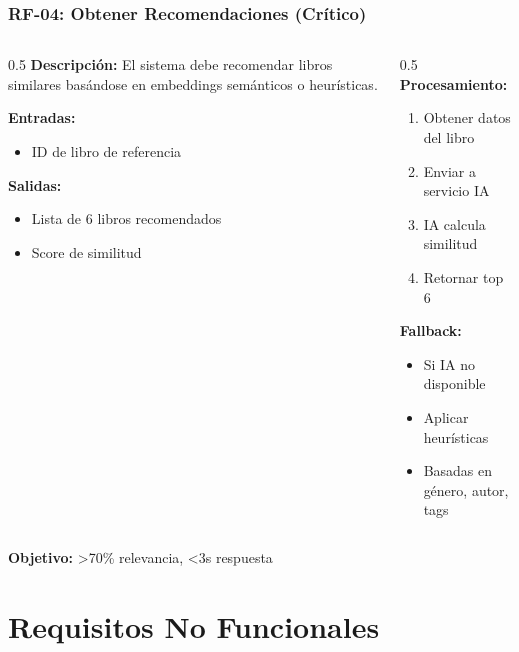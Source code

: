 \documentclass[aspectratio=169]{beamer}
\begin{document}
\begin{frame}
\frametitle{RF-04: Obtener Recomendaciones (Crítico)}

\begin{columns}
\begin{column}{0.5\textwidth}
\textbf{Descripción:}
El sistema debe recomendar libros similares basándose en embeddings semánticos o heurísticas.

\textbf{Entradas:}
\begin{itemize}
\item ID de libro de referencia
\end{itemize}

\textbf{Salidas:}
\begin{itemize}
\item Lista de 6 libros recomendados
\item Score de similitud
\end{itemize}
\end{column}

\begin{column}{0.5\textwidth}
\textbf{Procesamiento:}
\begin{enumerate}
\item Obtener datos del libro
\item Enviar a servicio IA
\item IA calcula similitud
\item Retornar top 6
\end{enumerate}

\textbf{Fallback:}
\begin{itemize}
\item Si IA no disponible
\item Aplicar heurísticas
\item Basadas en género, autor, tags
\end{itemize}
\end{column}
\end{columns}

\vspace{0.3cm}

\begin{tcolorbox}[colback=green!5, colframe=green!50]
\textbf{Objetivo:} >70\% relevancia, <3s respuesta
\end{tcolorbox}

\end{frame}

\section{Requisitos No Funcionales}
\end{document}
